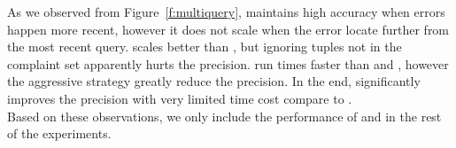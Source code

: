 As we observed from Figure~\ref{f:multiquery}, \milpall maintains high accuracy when errors
happen more recent, however it does not scale when the error locate further from the most
recent query. \milptuple scales better than \milpall, but ignoring tuples not 
in the complaint set apparently hurts the precision. \milptuplestopearly run times faster
than \milpall and \milptuple, however the aggressive strategy greatly reduce the 
precision. In the end, \milpadvtuple significantly improves the precision with very limited
time cost compare to \milptuple. \\
Based on these observations, we only include the performance of \milpadvtuple and \milpadvall
in the rest of the experiments. 

